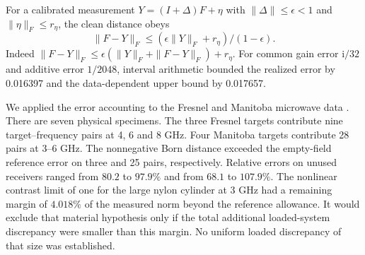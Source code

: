 For a calibrated measurement $Y=(I+\Delta)F+\eta$ with $\|\Delta\|\le\epsilon<1$ and $\|\eta\|_F\le r_\eta$, the clean distance obeys
\begin{equation}
 \|F-Y\|_F\le(\epsilon\|Y\|_F+r_\eta)/(1-\epsilon).
 \label{eq:gain}
\end{equation}
Indeed $\|F-Y\|_F\le\epsilon(\|Y\|_F+\|F-Y\|_F)+r_\eta$. For common gain error $\mathrm i/32$ and additive error $1/2048$, interval arithmetic bounded the realized error by 0.016397 and the data-dependent upper bound by 0.017657.

We applied the error accounting to the Fresnel and Manitoba microwave data \cite{fresnel,manitoba}. There are seven physical specimens. The three Fresnel targets contribute nine target--frequency pairs at 4, 6 and 8 GHz. Four Manitoba targets contribute 28 pairs at 3--6 GHz. The nonnegative Born distance exceeded the empty-field reference error on three and 25 pairs, respectively. Relative errors on unused receivers ranged from $80.2$ to $97.9\%$ and from $68.1$ to $107.9\%$. The nonlinear contrast limit of one for the large nylon cylinder at 3 GHz had a remaining margin of $4.018\%$ of the measured norm beyond the reference allowance. It would exclude that material hypothesis only if the total additional loaded-system discrepancy were smaller than this margin. No uniform loaded discrepancy of that size was established.
